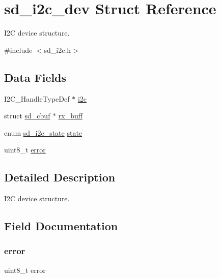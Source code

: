 \hypertarget{structsd__i2c__dev}{}\section{sd\+\_\+i2c\+\_\+dev Struct Reference}
\label{structsd__i2c__dev}


I2C device structure.  




{\ttfamily \#include $<$sd\+\_\+i2c.\+h$>$}

\subsection*{Data Fields}
\begin{DoxyCompactItemize}
\item 
I2\+C\+\_\+\+Handle\+Type\+Def $\ast$ \mbox{\hyperlink{structsd__i2c__dev_a23e125244a7e27ff9ccc31b3b8495cfe}{i2c}}
\item 
struct \mbox{\hyperlink{structsd__cbuf}{sd\+\_\+cbuf}} $\ast$ \mbox{\hyperlink{structsd__i2c__dev_a2bc17c33f4234299b83ba5d98edd5887}{rx\+\_\+buff}}
\item 
enum \mbox{\hyperlink{group___s_d___i2_c___types_gaf9254fee305a19fcc68f616121146552}{sd\+\_\+i2c\+\_\+state}} \mbox{\hyperlink{structsd__i2c__dev_a98f804dd76a5f720aeed34756d2142e4}{state}}
\item 
uint8\+\_\+t \mbox{\hyperlink{structsd__i2c__dev_adc64ccb7538429fe78e3fe0139267370}{error}}
\end{DoxyCompactItemize}


\subsection{Detailed Description}
I2C device structure. 

\subsection{Field Documentation}
\mbox{\label{structsd__i2c__dev_adc64ccb7538429fe78e3fe0139267370}} 
\subsubsection{\texorpdfstring{error}{error}}
{\footnotesize\ttfamily uint8\+\_\+t error}


